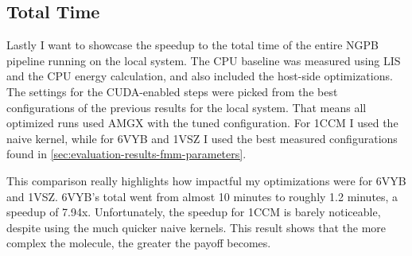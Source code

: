 

\FloatBarrier

\subsection{Total Time}
\label{evaluation-results-total-time}

Lastly I want to showcase the speedup to the total time of the entire NGPB pipeline running on the local system.
The CPU baseline was measured using LIS and the CPU energy calculation, and also included the host-side optimizations.
The settings for the CUDA-enabled steps were picked from the best configurations of the previous results for the local system.
That means all optimized runs used AMGX with the tuned configuration.
For 1CCM I used the naive kernel, while for 6VYB and 1VSZ I used the best measured configurations found in \ref{sec:evaluation-results-fmm-parameters}.

This comparison really highlights how impactful my optimizations were for 6VYB and 1VSZ.
6VYB's total went from almost 10 minutes to roughly 1.2 minutes, a speedup of 7.94x.
Unfortunately, the speedup for 1CCM is barely noticeable, despite using the much quicker naive kernels.
This result shows that the more complex the molecule, the greater the payoff becomes.

%
%



\FloatBarrier
